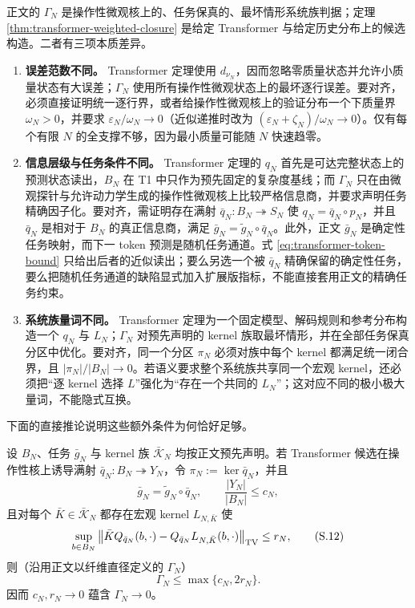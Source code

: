 正文的 $\Gamma_N$ 是操作性微观核上的、任务保真的、最坏情形系统族判据；定理
\ref{thm:transformer-weighted-closure} 是给定 Transformer 与给定历史分布上的候选构造。二者有三项本质差异。

\begin{enumerate}
 \item \textbf{误差范数不同。}
 Transformer 定理使用 $d_{\nu_N}$，因而忽略零质量状态并允许小质量状态有大误差；$\Gamma_N$ 使用所有操作性微观状态上的最坏逐行误差。要对齐，必须直接证明统一逐行界，或者给操作性微观核上的验证分布一个下质量界 $\omega_N>0$，并要求
 $\varepsilon_N/\omega_N\to0$（近似递推时改为
 $(\varepsilon_N+\zeta_N)/\omega_N\to0$）。仅有每个有限 $N$ 的全支撑不够，因为最小质量可能随 $N$ 快速趋零。

 \item \textbf{信息层级与任务条件不同。}
 Transformer 定理的 $q_N$ 首先是可达完整状态上的预测状态读出，$B_N$ 在 T1 中只作为预先固定的复杂度基线；而 $\Gamma_N$ 只在由微观探针与允许动力学生成的操作性微观核上比较严格信息商，并要求声明任务精确因子化。要对齐，需证明存在满射 $\bar q_N:B_N\twoheadrightarrow S_N$ 使
 $q_N=\bar q_N\circ p_N$，并且 $\bar q_N$ 是相对于 $B_N$ 的真正信息商，满足
 $\bar g_N=\widetilde g_N\circ\bar q_N$。此外，正文 $\bar g_N$ 是确定性任务映射，而下一 token 预测是随机任务通道。式
 \eqref{eq:transformer-token-bound} 只给出后者的近似读出；要么另选一个被 $\bar q_N$ 精确保留的确定性任务，要么把随机任务通道的缺陷显式加入扩展版指标，不能直接套用正文的精确任务约束。

 \item \textbf{系统族量词不同。}
 Transformer 定理为一个固定模型、解码规则和参考分布构造一个 $q_N$ 与 $L_N$；$\Gamma_N$ 对预先声明的 kernel 族取最坏情形，并在全部任务保真分区中优化。要对齐，同一个分区 $\pi_N$ 必须对族中每个 kernel 都满足统一闭合界，且
 $|\pi_N|/|B_N|\to0$。若语义要求整个系统族共享同一个宏观 kernel，还必须把“逐 kernel 选择 $L$”强化为“存在一个共同的 $L_N$”；这对应不同的极小极大量词，不能隐式互换。
\end{enumerate}

下面的直接推论说明这些额外条件为何恰好足够。

\begin{proposition}
\label{prop:transformer-gamma-alignment}
设 $B_N$、任务 $\bar g_N$ 与 kernel 族
$\bar{\mathcal K}_N$ 均按正文预先声明。若 Transformer 候选在操作性核上诱导满射
$\bar q_N:B_N\twoheadrightarrow Y_N$，令
$\pi_N:=\ker\bar q_N$，并且
\[
 \bar g_N=\widetilde g_N\circ\bar q_N,
 \qquad \frac{|Y_N|}{|B_N|}\le c_N,
\]
且对每个 $\bar K\in\bar{\mathcal K}_N$ 都存在宏观 kernel
$L_{N,\bar K}$ 使
\[
 \sup_{b\in B_N}
 \left\|\bar KQ_{\bar q_N}(b,\cdot)
       -Q_{\bar q_N}L_{N,\bar K}(b,\cdot)\right\|_{\operatorname{TV}}
 \le r_N,
 \tag{S.12}\label{eq:gamma-aligned-row-bound}
\]
则（沿用正文以纤维直径定义的 $\Gamma_N$）
\[
 \Gamma_N\le\max\{c_N,2r_N\}.
 \tag{S.13}\label{eq:gamma-candidate-upper}
\]
因而 $c_N,r_N\to0$ 蕴含 $\Gamma_N\to0$。
\end{proposition}

